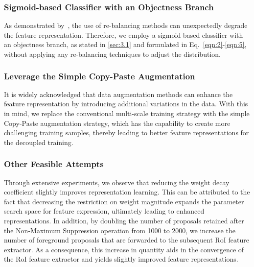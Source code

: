 \documentclass[lettersize,journal]{IEEEtran}
\begin{document}
\subsubsection{Sigmoid-based Classifier with an Objectness Branch}

As demonstrated by~\cite{zhou2020bbn}, the use of re-balancing methods can unexpectedly degrade the feature representation.
Therefore, we employ a sigmoid-based classifier with an objectness branch, as stated in \ref{sec:3.1} and formulated in Eq.~\eqref{eqn:2}-\eqref{eqn:5}, without applying any re-balancing techniques to adjust the distribution.


\subsubsection{Leverage the Simple Copy-Paste Augmentation~\cite{ghiasi2021simple}}
It is widely acknowledged that data augmentation methods can enhance the feature representation by introducing additional variations in the data. With this in mind, we replace the conventional multi-scale training strategy with the simple Copy-Paste augmentation strategy, which has the capability to create more challenging training samples, thereby leading to better feature representations for the decoupled training.


\subsubsection{Other Feasible Attempts}

Through extensive experiments, we observe that reducing the weight decay coefficient slightly improves representation learning. This can be attributed to the fact that decreasing the restriction on weight magnitude expands the parameter search space for feature expression, ultimately leading to enhanced representations.
In addition, by doubling the number of proposals retained after the Non-Maximum Suppression operation from 1000 to 2000, we increase the number of foreground proposals that are forwarded to the subsequent RoI feature extractor.
As a consequence, this increase in quantity aids in the convergence of the RoI feature extractor and yields slightly improved feature representations.
\end{document}
